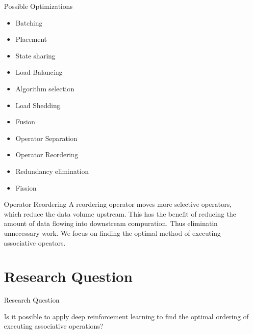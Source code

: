 \begin{frame}{Possible Optimizations}
    \begin{itemize}
        \item Batching
        \item Placement
        \item State sharing
        \item Load Balancing
        \item Algorithm selection
        \item Load Shedding
        \item Fusion
        \item Operator Separation
        \item Operator Reordering
        \item Redundancy elimination
        \item Fission
    \end{itemize}
\end{frame}

\begin{frame}{Operator Reordering}
    A reordering operator moves more selective operators, which reduce the data volume upstream. This has the benefit of reducing the amount of data flowing into downstream compuration. Thus eliminatin unnecessary work. 
    We focus on finding the optimal method of executing associative opeators.
\end{frame}

\section{Research Question}
\frame{\sectionpage}

\begin{frame}{Research Question}
    \begin{center}
    Is it possible to apply deep reinforcement learning to find the optimal ordering of executing associative operations?
    \end{center}
\end{frame}


